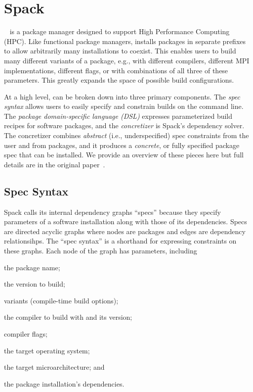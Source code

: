 \section{Spack}
\label{sec:software-model}

\spack~\cite{gamblin+:sc15} is a package manager designed to support High Performance
Computing (HPC). Like functional package managers, \spack installs packages in separate
prefixes to allow arbitrarily many installations to coexist. This enables users to build
many different variants of a package, e.g., with different compilers, different MPI
implementations, different flags, or with combinations of all three of these parameters.
This greatly expands the space of possible build configurations.

At a high level, \spack can be broken down into three primary components. The {\it spec
  syntax} allows users to easily specify and constrain builds on the command line. The
{\it package domain-specific language (DSL)} expresses parameterized build recipes for
software packages, and the {\it concretizer} is Spack's dependency solver. The
concretizer combines {\it abstract} (i.e., underspecified) spec constraints from the
user and from packages, and it produces a {\it concrete}, or fully specified package
spec that can be installed. We provide an overview of these pieces here but full details
are in the original paper~\cite{gamblin+:sc15}.

\subsection{Spec Syntax}
\label{sec:specs}

Spack calls its internal dependency graphs ``specs'' because they specify parameters of
a software installation along with those of its dependencies. Specs are directed acyclic
graphs where nodes are packages and edges are dependency relationsihps. The ``spec
syntax'' is a shorthand for expressing constraints on these graphs. Each node of the
graph has parameters, including
\begin{enumerate*}
\item the package name;
\item the version to build;
\item variants (compile-time build options);
\item the compiler to build with and its version;
\item compiler flags;
\item the target operating system;
\item the target microarchitecture; and
\item the package installation's dependencies.
\end{enumerate*}

